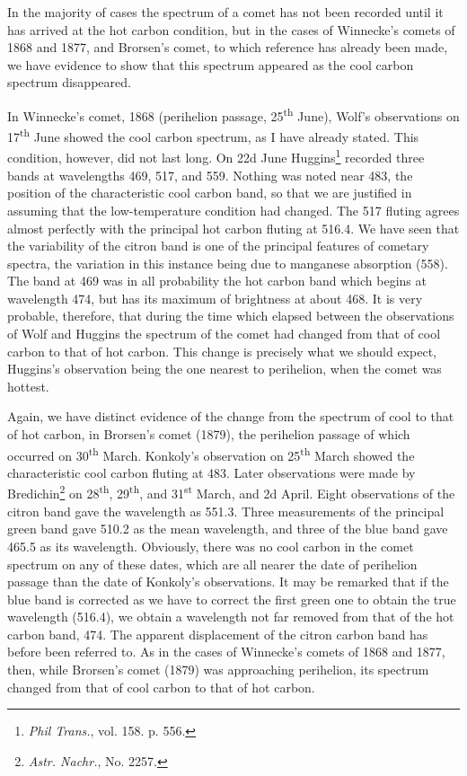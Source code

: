 \documentclass[a4paper, 12pt, oneside, polutonikogreek, english]{article}
\begin{document}
In the majority of cases the spectrum of a comet has not been recorded until it has arrived at the hot carbon condition, but in the cases of Winnecke's comets of 1868 and 1877, and Brorsen's comet, to which reference has already been made, we have evidence to show that this spectrum appeared as the cool carbon spectrum disappeared.

In Winnecke's comet, 1868 (perihelion passage, 25\textsuperscript{th} June), Wolf's observations on 17\textsuperscript{th} June showed the cool carbon spectrum, as I have already stated. This condition, however, did not last long. On 22d June Huggins\footnote{\emph{Phil Trans.}, vol. 158. p. 556.} recorded three bands at wavelengths 469, 517, and 559. Nothing was noted near 483, the position of the characteristic cool carbon band, so that we are justified in assuming that the low-temperature condition had changed. The 517 fluting agrees almost perfectly with the principal hot carbon fluting at 516.4. We have seen that the variability of the citron band is one of the principal features of cometary spectra, the variation in this instance being due to manganese absorption (558). The band at 469 was in all probability the hot carbon band which begins at wavelength 474, but has its maximum of brightness at about 468. It is very probable, therefore, that during the time which elapsed between the observations of Wolf and Huggins the spectrum of the comet had changed from that of cool carbon to that of hot carbon. This change is precisely what we should expect, Huggins's observation being the one nearest to perihelion, when the comet was hottest.

Again, we have distinct evidence of the change from the spectrum of cool to that of hot carbon, in Brorsen's comet (1879), the perihelion passage of which occurred on 30\textsuperscript{th} March. Konkoly's observation on 25\textsuperscript{th} March showed the characteristic cool carbon fluting at 483. Later observations were made by Bredichin\footnote{\emph{Astr. Nachr.}, No. 2257.} on 28\textsuperscript{th}, 29\textsuperscript{th}, and 31\textsuperscript{st} March, and 2d April. Eight observations of the citron band gave the wavelength as 551.3. Three measurements of the principal green band gave 510.2 as the mean wavelength, and three of the blue band gave 465.5 as its wavelength. Obviously, there was no cool carbon in the comet spectrum on any of these dates, which are all nearer the date of perihelion passage than the date of Konkoly's observations. It may be remarked that if the blue band is corrected as we have to correct the first green one to obtain the true wavelength (516.4), we obtain a wavelength not far removed from that of the hot carbon band, 474. The apparent displacement of the citron carbon band has before been referred to. As in the cases of Winnecke's comets of 1868 and 1877, then, while Brorsen's comet (1879) was approaching perihelion, its spectrum changed from that of cool carbon to that of hot carbon.
\end{document}
